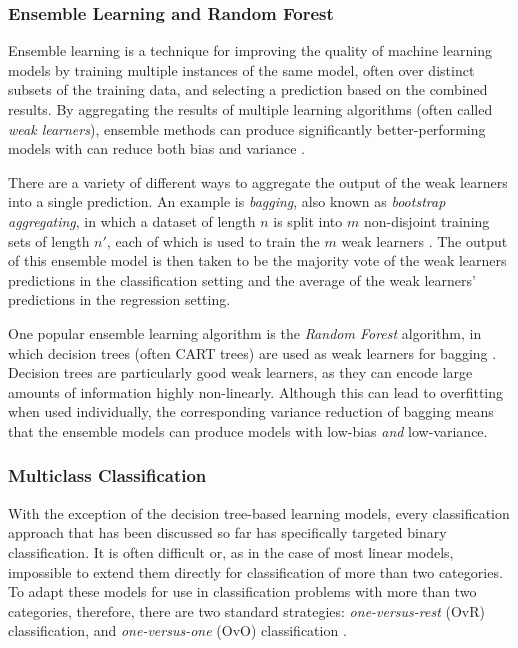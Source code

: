 \documentclass{report}
\begin{document}
\subsubsection{Ensemble Learning and Random Forest}

Ensemble learning is a technique for improving the quality of machine learning models by training multiple instances of the same model, often over distinct subsets of the training data, and selecting a prediction based on the combined results\cite{hastie2009elements}. By aggregating the results of multiple learning algorithms (often called \textit{weak learners}), ensemble methods can produce significantly better-performing models with can reduce both bias and variance \cite{dietterich-2000-ensemble}.

There are a variety of different ways to aggregate the output of the weak learners into a single prediction. An example is \textit{bagging}, also known as \textit{bootstrap aggregating}, in which a dataset of length $n$ is split into $m$ non-disjoint training sets of length $n'$, each of which is used to train the $m$ weak learners \cite{Breiman1996Bagging}. The output of this ensemble model is then taken to be the majority vote of the weak learners predictions in the classification setting and the average of the weak learners' predictions in the regression setting.

One popular ensemble learning algorithm is the \textit{Random Forest} algorithm, in which decision trees (often CART trees) are used as weak learners for bagging \cite{Breiman2001RandomForest}. Decision trees are particularly good weak learners, as they can encode large amounts of information highly non-linearly. Although this can lead to overfitting when used individually, the corresponding variance reduction of bagging means that the ensemble models can produce models with low-bias \textit{and} low-variance.


\subsubsection{Multiclass Classification}

With the exception of the decision tree-based learning models, every classification approach that has been discussed so far has specifically targeted binary classification. It is often difficult or, as in the case of most linear models, impossible to extend them directly for classification of more than two categories. To adapt these models for use in classification problems with more than two categories, therefore, there are two standard strategies: \textit{one-versus-rest} (OvR) classification, and \textit{one-versus-one} (OvO) classification \cite{bishop2006pattern}.
\end{document}
